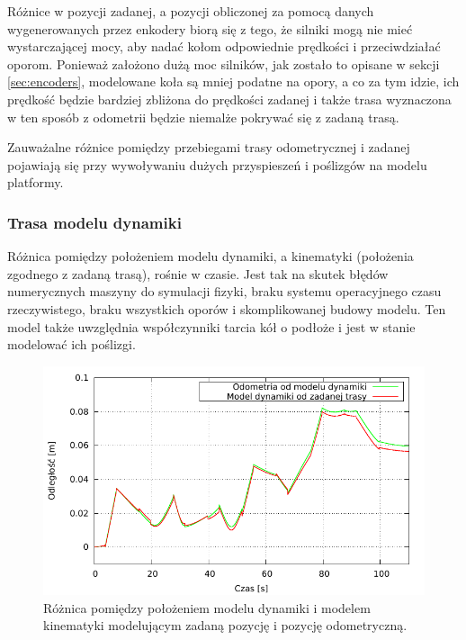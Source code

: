 			Różnice w pozycji zadanej, a pozycji obliczonej za pomocą danych wygenerowanych przez enkodery biorą się z tego, że
			silniki mogą nie mieć wystarczającej mocy, aby nadać kołom odpowiednie prędkości i przeciwdziałać oporom.
			Ponieważ założono dużą moc silników, jak zostało to opisane w sekcji \ref{sec:encoders}, modelowane koła są mniej podatne na opory, a co za tym idzie, 
			ich prędkość będzie bardziej zbliżona do prędkości zadanej i także trasa wyznaczona w ten sposób z odometrii będzie niemalże pokrywać się z zadaną trasą.
			
			Zauważalne różnice pomiędzy przebiegami trasy odometrycznej i zadanej pojawiają się przy wywoływaniu dużych przyspieszeń i poślizgów na modelu platformy.
			
		\subsubsection{Trasa modelu dynamiki}
			Różnica pomiędzy położeniem modelu dynamiki, a kinematyki (położenia zgodnego z zadaną trasą), rośnie w czasie.
			Jest tak na skutek błędów numerycznych maszyny do symulacji fizyki, braku systemu operacyjnego czasu rzeczywistego, braku wszystkich oporów i skomplikowanej budowy modelu.
			Ten model także uwzględnia współczynniki tarcia kół o podłoże i jest w stanie modelować ich poślizgi.
			
			\begin{figure}[H]
				\centering
				\includegraphics[width=\textwidth]{plots/comparison_dt.pdf}
					\caption{Różnica pomiędzy położeniem modelu dynamiki i modelem kinematyki modelującym zadaną pozycję i pozycję odometryczną.}
				\label{plot:comparison_dt}
			\end{figure}
			

